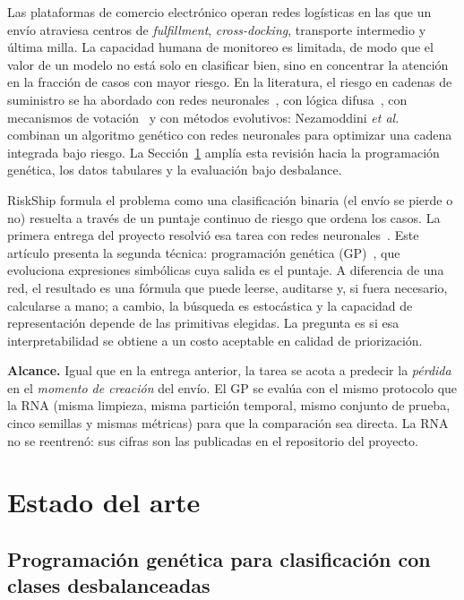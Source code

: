 \documentclass[conference]{IEEEtran}
\begin{document}
Las plataformas de comercio electrónico operan redes logísticas en las que un
envío atraviesa centros de \textit{fulfillment}, \textit{cross-docking},
transporte intermedio y última milla. La capacidad humana de
monitoreo es limitada, de modo que el valor de un modelo no está solo en
clasificar bien, sino en concentrar la atención en la fracción de casos con
mayor riesgo. En la literatura, el riesgo en cadenas de suministro se ha
abordado con redes neuronales~\cite{bortolini,ye}, con lógica
difusa~\cite{gajovic,aqlan}, con mecanismos de votación~\cite{ifac2022} y con
métodos evolutivos: Nezamoddini \textit{et al.}~\cite{nezamoddini} combinan un
algoritmo genético con redes neuronales para optimizar una cadena integrada
bajo riesgo. La Sección~\ref{sec:estado} amplía esta revisión hacia la
programación genética, los datos tabulares y la evaluación bajo desbalance.

RiskShip formula el problema como una clasificación binaria (el envío se
pierde o no) resuelta a través de un puntaje continuo de riesgo que ordena los
casos. La primera entrega del proyecto resolvió esa tarea con redes
neuronales~\cite{informe_rna}. Este artículo presenta la segunda técnica:
programación genética (GP)~\cite{koza}, que evoluciona expresiones simbólicas
cuya salida es el puntaje. A diferencia de una red, el resultado es una fórmula
que puede leerse, auditarse y, si fuera necesario, calcularse a mano; a cambio,
la búsqueda es estocástica y la capacidad de representación depende de las
primitivas elegidas. La pregunta es si esa interpretabilidad se obtiene a un
costo aceptable en calidad de priorización.

\textbf{Alcance.} Igual que en la entrega anterior, la tarea se acota a
predecir la \emph{pérdida} en el \emph{momento de creación} del envío. El GP se
evalúa con el mismo protocolo que la RNA (misma limpieza, misma partición
temporal, mismo conjunto de prueba, cinco semillas y mismas métricas) para que
la comparación sea directa. La RNA no se reentrenó: sus cifras son las
publicadas en el repositorio del proyecto.

\section{Estado del arte}
\label{sec:estado}

\subsection{Programación genética para clasificación con clases desbalanceadas}
\end{document}
